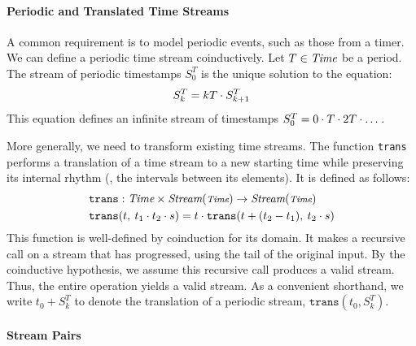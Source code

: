 \paragraph{Periodic and Translated Time Streams}

A common requirement is to model periodic events, such as those from a timer. We can define a
periodic time stream coinductively. Let $T \in \textit{Time}$ be a period. The stream of periodic timestamps
$S_0^T$ is the unique solution to the equation:
%
\begin{equation}
    S_k^T = kT \cdot S_{k+1}^T
\end{equation}
%
This equation defines an infinite stream of timestamps $S_0^T = 0 \cdot T \cdot 2T \cdot \dots$.

More generally, we need to transform existing time streams. The function \texttt{trans} performs a
translation of a time stream to a new starting time while preserving its internal rhythm (\ie, the
intervals between its elements). It is defined as follows:
%
\begin{align}
     & \texttt{trans} : \textit{Time} \times \textit{Stream}(\mbox{\footnotesize\ensuremath{\textit{Time}}}) \to \textit{Stream}(\mbox{\footnotesize\ensuremath{\textit{Time}}})                                       \\
     & \texttt{trans}(t, \: t_1 \cdot t_2 \cdot s) = t \cdot \texttt{trans}(t + (t_2 - t_1), \: t_2 \cdot s)
\end{align}
%
This function is well-defined by coinduction for its domain. It makes a recursive call on a stream
that has progressed, using the tail of the original input. By the coinductive hypothesis, we assume
this recursive call produces a valid stream. Thus, the entire operation yields a valid stream.
%
As a convenient shorthand, we write $t_0 + S_k^T$ to denote the translation of a periodic stream,
\ie $\texttt{trans}(t_0, S_k^T)$.

\paragraph{Stream Pairs}

